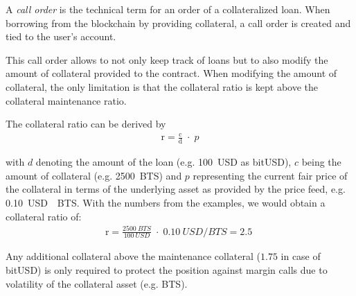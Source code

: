 \label{sec:callorder}

A \emph{call order} is the technical term for an order of a collateralized
loan. When borrowing from the blockchain by providing collateral, a call order
is created and tied to the user's account.

This call order allows to not only keep track of loans but to also modify the
amount of collateral provided to the contract. When modifying the amount of
collateral, the only limitation is that the collateral ratio is kept above the
collateral maintenance ratio.

The collateral ratio can be derived by
\begin{align*}
 \text{r} = \frac{\text{c}}{\text{d}} \;\cdot\; p
\end{align*}

with $d$ denoting the amount of the loan (e.g. \SI{100}{USD} as bitUSD), $c$ being the
amount of collateral (e.g. \SI{2500}{BTS}) and $p$ representing the current
fair price of the collateral in terms of the underlying asset as provided by
the price feed, e.g. \SI{0.10}{USD \per BTS}. With the numbers from the
examples, we would obtain a collateral ratio of:
\begin{align*}
 \text{r} = \frac{\SI{2500}{BTS}}{\SI{100}{USD}} \;\cdot\; \SI{0.10}{USD \per BTS} = 2.5\; 
\end{align*}

Any additional collateral above the maintenance collateral ($1.75$ in case of
bitUSD) is only required to protect the position against margin calls due to
volatility of the collateral asset (e.g. BTS).

